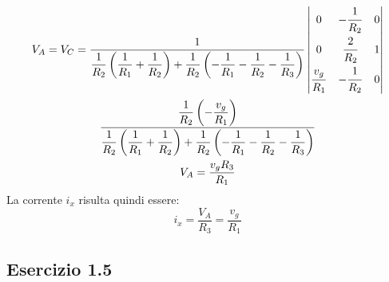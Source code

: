 \documentclass{article}
\begin{document}
\begin{gather*}
    V_A=V_C=\displaystyle\frac{1}{\displaystyle\frac{1}{R_2}\left(\frac{1}{R_1}+\frac{1}{R_2}\right)+\frac{1}{R_2}\left(-\frac{1}{R_1}-\frac{1}{R_2}-\frac{1}{R_3}\right)}
    \begin{vmatrix}
        0&-\displaystyle\frac{\strut1}{\strut R_2}&0\\
        0&\displaystyle\frac{\strut2}{\strut R_2}&1\\
        \displaystyle\frac{\strut v_g}{\strut R_1}&-\displaystyle\frac{\strut1}{\strut R_2}&0
    \end{vmatrix}\\
    \displaystyle\frac{\displaystyle\frac{1}{R_2}\left(-\frac{v_g}{R_1}\right)}{\displaystyle\frac{1}{R_2}\left(\frac{1}{R_1}+\frac{1}{R_2}\right)+\frac{1}{R_2}\left(-\frac{1}{R_1}-\frac{1}{R_2}-\frac{1}{R_3}\right)}\\
    V_A=\displaystyle\frac{v_gR_3}{R_1}
\end{gather*}
La corrente $i_x$ risulta quindi essere:
\begin{equation}
    i_x=\displaystyle\frac{V_A}{R_3}=\frac{v_g}{R_1}
\end{equation}

\subsection{Esercizio 1.5}
\end{document}
